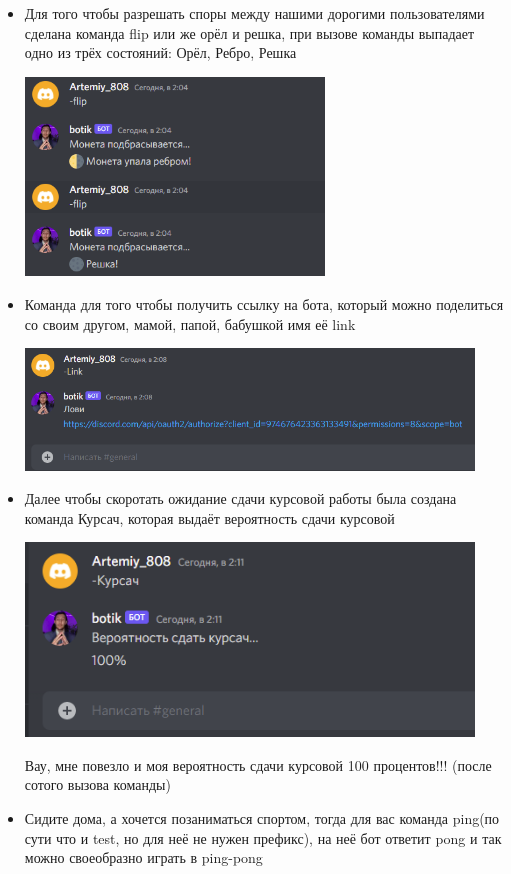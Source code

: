\documentclass[a4paper,12pt]{article}
\begin{document}
\begin{itemize}
    \item Для того чтобы разрешать споры между нашими дорогими пользователями сделана команда flip или же орёл и решка, при вызове команды выпадает одно из трёх состояний: Орёл, Ребро, Решка \\
    \centerline{\includegraphics[width = 300px]{pictures/flip.png}}
    \item Команда для того чтобы получить ссылку на бота, который можно поделиться со своим другом, мамой, папой, бабушкой имя её link \\
    \centerline{\includegraphics[width = 450px]{pictures/Link.png}}
\newpage
    \item Далее чтобы скоротать ожидание сдачи курсовой работы была создана команда Курсач, которая выдаёт вероятность сдачи курсовой
    \centerline{\includegraphics[width = 450px]{pictures/kurs.png}}
    Вау, мне повезло и моя вероятность сдачи курсовой 100 процентов!!! (после сотого вызова команды)
    \item Сидите дома, а хочется позаниматься спортом, тогда для вас команда ping(по сути что и test, но для неё не нужен префикс), на неё бот ответит pong и так можно своеобразно играть в ping-pong

\end{itemize}
\end{document}
